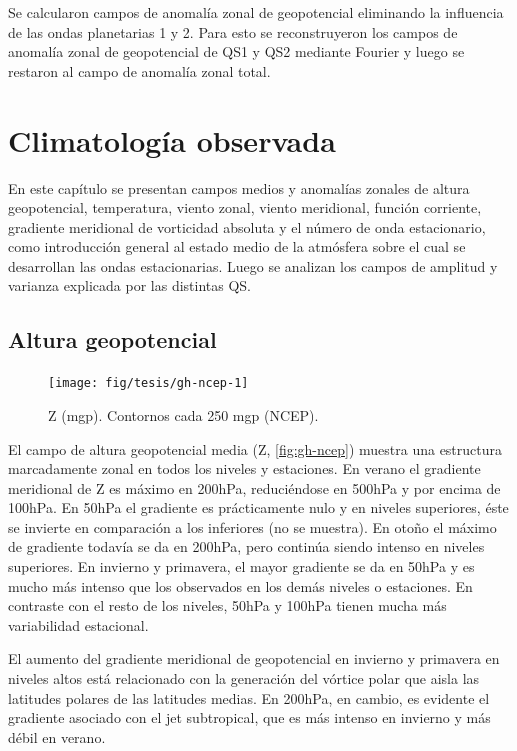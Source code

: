\documentclass[spanish,a4paper,12pt,oneside]{book}
\begin{document}
Se calcularon campos de anomalía zonal de geopotencial eliminando la
influencia de las ondas planetarias 1 y 2. Para esto se reconstruyeron
los campos de anomalía zonal de geopotencial de QS1 y QS2 mediante
Fourier y luego se restaron al campo de anomalía zonal total.

\chapter{Climatología observada}\label{climatologia-observada}

En este capítulo se presentan campos medios y anomalías zonales de
altura geopotencial, temperatura, viento zonal, viento meridional,
función corriente, gradiente meridional de vorticidad absoluta y el
número de onda estacionario, como introducción general al estado medio
de la atmósfera sobre el cual se desarrollan las ondas estacionarias.
Luego se analizan los campos de amplitud y varianza explicada por las
distintas QS.

\section{Altura geopotencial}\label{altura-geopotencial}

\begin{landscape}\begin{figure}

{\centering \texttt{[image: fig/tesis/gh-ncep-1]} 

}

\caption{Z (mgp). Contornos cada 250 mgp (NCEP).}\label{fig:gh-ncep}
\end{figure}
\end{landscape}

El campo de altura geopotencial media (Z, \autoref{fig:gh-ncep}) muestra
una estructura marcadamente zonal en todos los niveles y estaciones. En
verano el gradiente meridional de Z es máximo en 200hPa, reduciéndose en
500hPa y por encima de 100hPa. En 50hPa el gradiente es prácticamente
nulo y en niveles superiores, éste se invierte en comparación a los
inferiores (no se muestra). En otoño el máximo de gradiente todavía se
da en 200hPa, pero continúa siendo intenso en niveles superiores. En
invierno y primavera, el mayor gradiente se da en 50hPa y es mucho más
intenso que los observados en los demás niveles o estaciones. En
contraste con el resto de los niveles, 50hPa y 100hPa tienen mucha más
variabilidad estacional.

El aumento del gradiente meridional de geopotencial en invierno y
primavera en niveles altos está relacionado con la generación del
vórtice polar que aisla las latitudes polares de las latitudes medias.
En 200hPa, en cambio, es evidente el gradiente asociado con el jet
subtropical, que es más intenso en invierno y más débil en verano.
\end{document}
